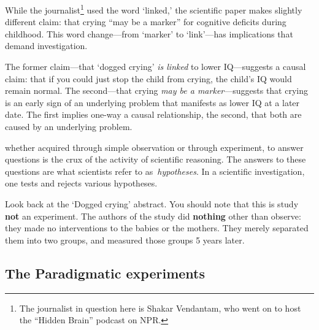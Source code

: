 \begin{refsection}
While the journalist\footnote{The journalist in question here is Shakar Vendantam, who went on to host the “Hidden Brain” podcast on NPR.} used the word ‘linked,’ the scientific paper makes slightly different claim: that crying “may be a marker” for cognitive deficits during childhood. This word change---from ‘marker’ to ‘link’---has implications that demand investigation.

The former claim---that ‘dogged crying’ \emph{is linked} to lower IQ---suggests a causal claim: that if you could just stop the child from crying, the child’s IQ would remain normal. The second---that crying \emph{may be a marker}---suggests that crying is an early sign of an underlying problem that manifests as lower IQ at a later date. The first implies one-way a causal relationship, the second, that both are caused by an underlying problem.

 whether acquired through simple observation or through experiment, to answer questions is the crux of the activity of scientific reasoning. The answers to these questions are what scientists refer to as \emph{hypotheses}. In a scientific investigation, one tests and rejects various hypotheses. 

Look back at the ‘Dogged crying’ abstract. You should note that this is study \textbf{not} an experiment. The authors of the study did \textbf{nothing} other than observe: they made no interventions to the babies or the mothers. They merely separated them into two groups, and measured those groups 5 years later. 

\subsection{The Paradigmatic experiments}
\label{theparadigmaticexperiments}


\end{refsection}
